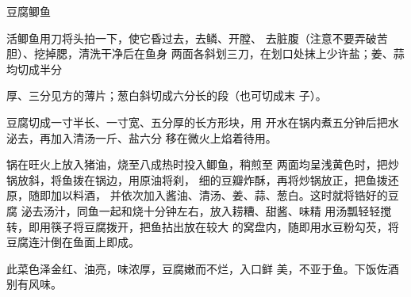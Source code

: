 \begin{recipe}{豆腐鲫鱼}

\ingredients



\cooking

\step 活鲫鱼用刀将头拍一下，使它昏过去，去鳞、开膛、 去脏腹（注意不要弄破苦胆）、挖掉腮，清洗干净后在鱼身 两面各斜划三刀，在划口处抹上少许盐；姜、蒜均切成半分

厚、三分见方的薄片；葱白斜切成六分长的段（也可切成末 子）。

\step 豆腐切成一寸半长、一寸宽、五分厚的长方形块，用 开水在锅内煮五分钟后把水泌去，再加入清汤一斤、盐六分 移在微火上焰着待用。

锅在旺火上放入猪油，烧至八成热时投入鲫鱼，稍煎至 两面均呈浅黄色时，把炒锅放斜，将鱼拨在锅边，用原油将刹， 细的豆瓣炸酥，再将炒锅放正，把鱼拨还原，随即加以料酒， 并依次加入酱油、清汤、姜、蒜、葱白。这时就将锆好的豆腐 泌去汤汁，同鱼一起和烧十分钟左右，放入耢糟、甜酱、味精 用汤瓢轻轻搅转，即用筷子将豆腐拨开，把鱼拈出放在较大 的窝盘内，随即用水豆粉勾芡，将豆腐连汁倒在鱼面上即成。

\notes

此菜色泽金红、油亮，味浓厚，豆腐嫩而不烂，入口鲜 美，不亚于鱼。下饭佐酒别有风味。

\end{recipe}

